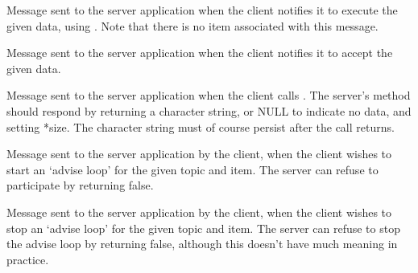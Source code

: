 \label{wxconnectiononexec}


Message sent to the server application when the client notifies
it to execute the given data, using .
Note that there is no item associated with this message.

\label{wxconnectiononpoke}


Message sent to the server application when the client notifies it to
accept the given data.

\label{wxconnectiononrequest}


Message sent to the server application when the client calls 
. The
server's  method
should respond by returning a character string, or NULL to
indicate no data, and setting *size. The character string must of
course persist after the call returns.

\label{wxconnectiononstartadvise}


Message sent to the server application by the client, when the client
wishes to start an `advise loop' for the given topic and item. The
server can refuse to participate by returning false.

\label{wxconnectiononstopadvise}


Message sent to the server application by the client, when the client
wishes to stop an `advise loop' for the given topic and item. The
server can refuse to stop the advise loop by returning false, although
this doesn't have much meaning in practice.

